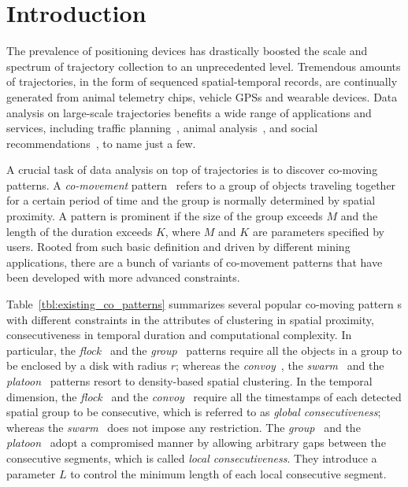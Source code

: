 
\section{Introduction}
The prevalence of positioning devices has drastically boosted 
the scale and spectrum of trajectory collection to an unprecedented level. 
Tremendous amounts of trajectories, in the form of sequenced spatial-temporal 
records, are continually generated from animal telemetry chips, 
vehicle GPSs and wearable devices. Data analysis on large-scale 
trajectories benefits a wide range of applications and services, 
including traffic planning~\cite{zheng2011urban}, animal analysis~\cite{li2010miningperiodic}, and social recommendations~\cite{bao2013survey}, to name just a few.

A crucial task of data analysis on top of trajectories is 
to discover co-moving patterns. A \emph{co-movement} pattern~\cite{li2013managing} 
refers to a group of objects traveling together for a certain period of time 
and the group is normally determined by spatial proximity. 
A pattern is prominent if the size of the group exceeds $M$ and the length of the duration exceeds $K$, where $M$ and $K$ are parameters specified by users. Rooted from such basic definition 
and driven by different mining applications, there are a bunch of variants 
of co-movement patterns that have been developed with more advanced constraints.

Table~\ref{tbl:existing_co_patterns} summarizes several popular co-moving pattern s 
with different constraints in the attributes of clustering in spatial proximity,
consecutiveness in temporal duration and computational complexity. 
In particular,  the \emph{flock}~\cite{gudmundsson2006flock} 
and the \emph{group}~\cite{wang2006grouppattern} patterns require 
all the objects in a group to be enclosed by a disk with radius $r$; 
whereas the \emph{convoy}~\cite{jeung2008convoy}, the \emph{swarm}~\cite{li2010swarm} 
and the \emph{platoon}~\cite{li2015platoon} patterns resort to density-based 
spatial clustering. 
In the temporal dimension, the \emph{flock}~\cite{gudmundsson2006flock} 
and the \emph{convoy}~\cite{jeung2008convoy} require all the timestamps 
of each detected spatial group to be consecutive, which is referred to as \emph{global consecutiveness}; 
whereas the \emph{swarm}~\cite{li2010swarm} does not impose any restriction. 
The \emph{group}~\cite{wang2006grouppattern} and the \emph{platoon}~\cite{li2015platoon} adopt a compromised manner by allowing
arbitrary gaps between the consecutive segments, which is called \emph{local consecutiveness}. 
They introduce a parameter $L$ to control the minimum length of each local consecutive segment.

